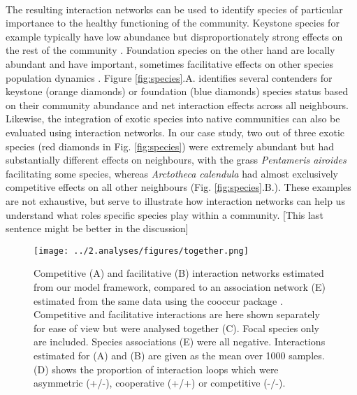 \documentclass[a4,12pt]{article}
\begin{document}
    \paragraph{} 
    The resulting interaction networks can be used to identify species of particular importance to the healthy functioning of the community. Keystone species for example typically have low abundance but disproportionately strong effects on the rest of the community \citep{Power1996}. Foundation species on the other hand are locally abundant and have important, sometimes facilitative effects on other species population dynamics \citep{Ellison2019}. Figure \ref{fig:species}.A. identifies several contenders for keystone (orange diamonds) or foundation (blue diamonds) species status based on their community abundance and net interaction effects across all neighbours. Likewise, the integration of exotic species into native communities can also be evaluated using interaction networks. In our case study, two out of three exotic species (red diamonds in Fig. \ref{fig:species}) were extremely abundant but had substantially different effects on neighbours, with the grass \textit{Pentameris airoides} facilitating some species, whereas \textit{Arctotheca calendula} had almost exclusively competitive effects on all other neighbours (Fig. \ref{fig:species}.B.). These examples are not exhaustive, but serve to illustrate how interaction networks can help us understand what roles specific species play within a community.  [This last sentence might be better in the discussion]



    \begin{figure}[H]
        \hspace*{-2cm}
        \texttt{[image: ../2.analyses/figures/together.png]}
        \caption{Competitive (A) and facilitative (B) interaction networks estimated from our model framework, compared to an association network (E) estimated from the same data using the cooccur package \citep{Griffith2016}. Competitive and facilitative interactions are here shown separately for ease of view but were analysed together (C). Focal species only are included. Species associations (E) were all negative.  Interactions estimated for (A) and (B) are given as the mean over 1000 samples. (D) shows the proportion of interaction loops which were asymmetric (+/-), cooperative (+/+) or competitive (-/-).}
        \label{fig:netwks}
    \end{figure}    
\end{document}
